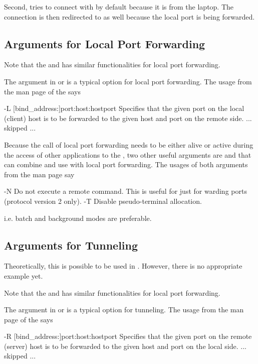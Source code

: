 Second,  tries to connect with 
by default because it is from the laptop. The connection is then
redirected to  as well because the local
port is being forwarded.


\subsection[Arguments for Local Port Forwarding]{Arguments for Local Port Forwarding}
\label{sec:arguments_local_port_forwarding}

Note that the  and  has similar functionalities
for local port forwarding.

The argument  in  or  is a typical option
for local port forwarding. The usage from the man page of the  says
\begin{Command}[title=From \code{ssh} man page]
-L [bind_address:]port:host:hostport
      Specifies that the given port on the local (client) host is
      to be forwarded to the given host and port on the remote side.
      ... skipped ...
\end{Command}

Because the call of local port forwarding
needs to be either alive or active during the access
of other applications to the ,
two other useful arguments are  and  that can combine and
use with local port forwarding. The usages of both arguments
from the man page say
\begin{Command}[title=From \code{ssh} man page]
-N    Do not execute a remote command.  This is useful for just
      for warding ports (protocol version 2 only).
-T    Disable pseudo-terminal allocation.
\end{Command}
i.e. batch and background modes are preferable.


\subsection[Arguments for Tunneling]{Arguments for Tunneling}
\label{sec:arguments_tunneling}

Theoretically, this is possible to be used in . However,
there is no appropriate example yet.

Note that the  and  has similar functionalities
for local port forwarding.

The argument  in  or  is a typical option
for tunneling. The usage from the man page of the  says
\begin{Command}[title=From \code{ssh} man page]
-R [bind_address:]port:host:hostport
      Specifies that the given port on the remote (server) host is to
      be forwarded to the given host and port on the local side.
      ... skipped ...
\end{Command}


